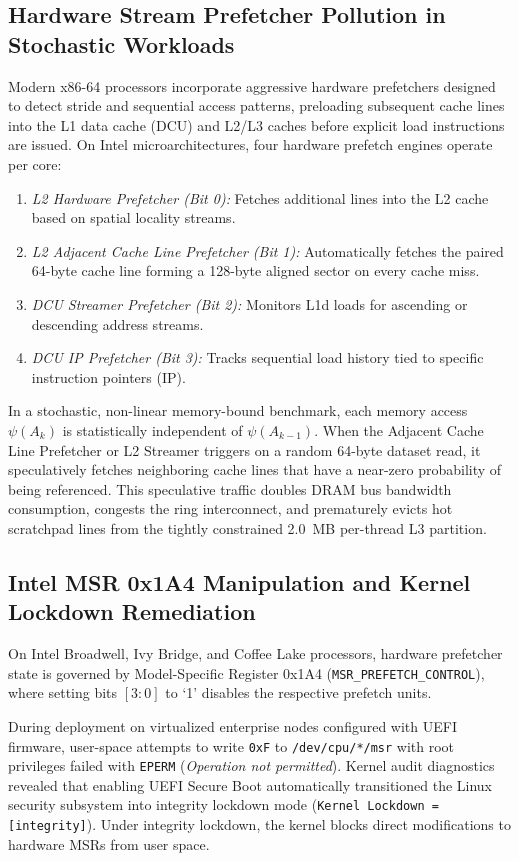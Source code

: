 \documentclass[journal]{IEEEtran}
\begin{document}
\subsection{Hardware Stream Prefetcher Pollution in Stochastic Workloads}
Modern x86-64 processors incorporate aggressive hardware prefetchers designed to detect stride and sequential access patterns, preloading subsequent cache lines into the L1 data cache (DCU) and L2/L3 caches before explicit load instructions are issued. On Intel microarchitectures, four hardware prefetch engines operate per core:
\begin{enumerate}
\item \textit{L2 Hardware Prefetcher (Bit 0):} Fetches additional lines into the L2 cache based on spatial locality streams.
\item \textit{L2 Adjacent Cache Line Prefetcher (Bit 1):} Automatically fetches the paired 64-byte cache line forming a 128-byte aligned sector on every cache miss.
\item \textit{DCU Streamer Prefetcher (Bit 2):} Monitors L1d loads for ascending or descending address streams.
\item \textit{DCU IP Prefetcher (Bit 3):} Tracks sequential load history tied to specific instruction pointers (IP).
\end{enumerate}

In a stochastic, non-linear memory-bound benchmark, each memory access $\psi(A_k)$ is statistically independent of $\psi(A_{k-1})$. When the Adjacent Cache Line Prefetcher or L2 Streamer triggers on a random 64-byte dataset read, it speculatively fetches neighboring cache lines that have a near-zero probability of being referenced. This speculative traffic doubles DRAM bus bandwidth consumption, congests the ring interconnect, and prematurely evicts hot scratchpad lines from the tightly constrained 2.0~MB per-thread L3 partition.

\subsection{Intel MSR 0x1A4 Manipulation and Kernel Lockdown Remediation}
On Intel Broadwell, Ivy Bridge, and Coffee Lake processors, hardware prefetcher state is governed by Model-Specific Register 0x1A4 (\texttt{MSR\_PREFETCH\_CONTROL}), where setting bits $[3:0]$ to `1' disables the respective prefetch units.

During deployment on virtualized enterprise nodes configured with UEFI firmware, user-space attempts to write \texttt{0xF} to \texttt{/dev/cpu/*/msr} with root privileges failed with \texttt{EPERM} (\textit{Operation not permitted}). Kernel audit diagnostics revealed that enabling UEFI Secure Boot automatically transitioned the Linux security subsystem into integrity lockdown mode (\texttt{Kernel Lockdown = [integrity]}). Under integrity lockdown, the kernel blocks direct modifications to hardware MSRs from user space.
\end{document}
